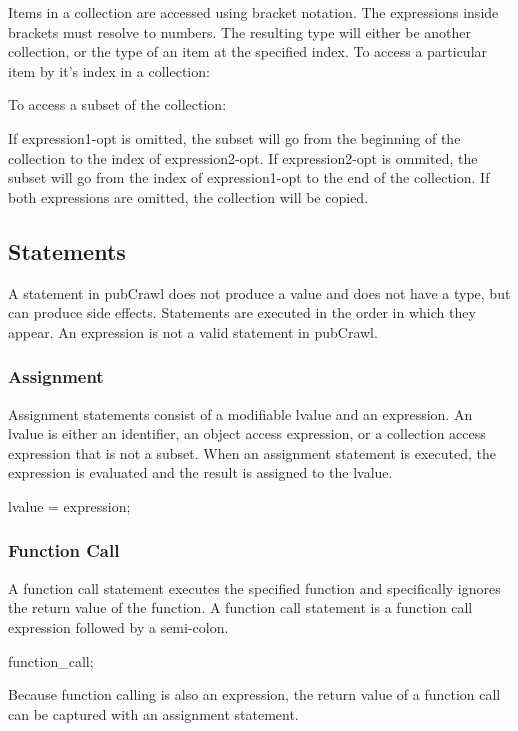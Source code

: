 \documentclass[oneside]{book}
\begin{document}
Items in a collection are accessed using bracket notation. The expressions inside brackets must resolve to numbers. The resulting type will either be another collection, or the type of an item at the specified index. To access a particular item by it's index in a collection:
\begin{code}
[ expression ]
\end{code}
To access a subset of the collection:
\begin{code}
\end{code}
If expression1-opt is omitted, the subset will go from the beginning of the collection to the index of expression2-opt. If expression2-opt is ommited, the subset will go from the index of expression1-opt to the end of the collection. If both expressions are omitted, the collection will be copied.

\subsection{Statements}

A statement in pubCrawl does not produce a value and does not have a type, but can produce side effects. Statements are executed in the order in which they appear. An expression is not a valid statement in pubCrawl.

\subsubsection{Assignment}

Assignment statements consist of a modifiable lvalue and an expression. An lvalue is either an identifier, an object access expression, or a collection access expression that is not a subset. When an assignment statement is executed, the expression is evaluated and the result is assigned to the lvalue.
\begin{code}
lvalue = expression;
\end{code}

\subsubsection{Function Call}

A function call statement executes the specified function and specifically ignores the return value of the function. A function call statement is a function call expression followed by a semi-colon.
\begin{code}
function_call;
\end{code}
Because function calling is also an expression, the return value of a function call can be captured with an assignment statement.
\end{document}
